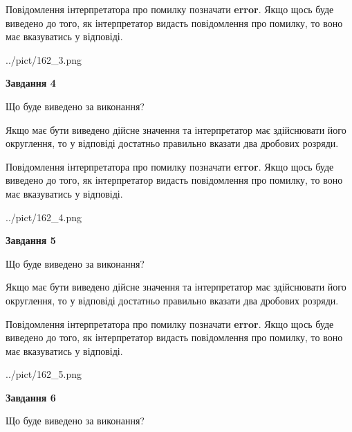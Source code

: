 \documentclass[12pt, ukrainian]{article}
\begin{document}
{\begin {Large}
Повідомлення інтерпретатора про помилку позначати \textbf{error}.
Якщо щось буде виведено до того, як інтерпретатор видасть повідомлення про помилку, 
то воно має вказуватись у відповіді. \par

\begin{center}
	{../pict/162_3.png}
\end{center}
\newpage

{\begin {center}\textbf{Завдання 4}\end {center}}\par
Що буде виведено за виконання? \par

Якщо має бути виведено дійсне значення та інтерпретатор має здійснювати його округлення, 
то у відповіді достатньо правильно вказати два дробових розряди.

Повідомлення інтерпретатора про помилку позначати \textbf{error}.
Якщо щось буде виведено до того, як інтерпретатор видасть повідомлення про помилку, 
то воно має вказуватись у відповіді. \par

\begin{center}
	{../pict/162_4.png}
\end{center}
\newpage

{\begin {center}\textbf{Завдання 5}\end {center}}\par
Що буде виведено за виконання? \par

Якщо має бути виведено дійсне значення та інтерпретатор має здійснювати його округлення, 
то у відповіді достатньо правильно вказати два дробових розряди.

Повідомлення інтерпретатора про помилку позначати \textbf{error}.
Якщо щось буде виведено до того, як інтерпретатор видасть повідомлення про помилку, 
то воно має вказуватись у відповіді. \par

\begin{center}
	{../pict/162_5.png}
\end{center}
\newpage

{\begin {center}\textbf{Завдання 6}\end {center}}\par
Що буде виведено за виконання? \par


\end{Large}}
\end{document}
